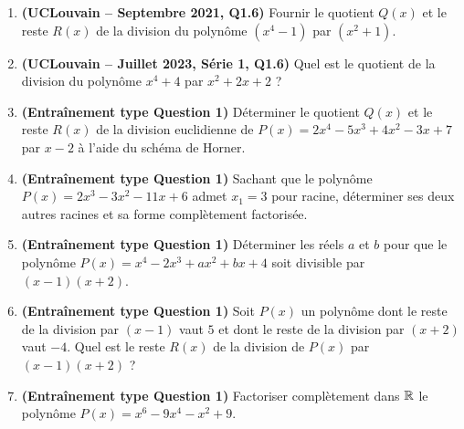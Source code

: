 \begin{enumerate}[label=\textbf{Exercice 1.\arabic* :}, leftmargin=*]
    \item \textbf{(UCLouvain -- Septembre 2021, Q1.6)} Fournir le quotient $Q(x)$ et le reste $R(x)$ de la division du polynôme $(x^4 - 1)$ par $(x^2 + 1)$.
    \item \textbf{(UCLouvain -- Juillet 2023, Série 1, Q1.6)} Quel est le quotient de la division du polynôme $x^4 + 4$ par $x^2 + 2x + 2$ ?
    \item \textbf{(Entraînement type Question 1)} Déterminer le quotient $Q(x)$ et le reste $R(x)$ de la division euclidienne de $P(x) = 2x^4 - 5x^3 + 4x^2 - 3x + 7$ par $x - 2$ à l'aide du schéma de Horner.
    \item \textbf{(Entraînement type Question 1)} Sachant que le polynôme $P(x) = 2x^3 - 3x^2 - 11x + 6$ admet $x_1 = 3$ pour racine, déterminer ses deux autres racines et sa forme complètement factorisée.
    \item \textbf{(Entraînement type Question 1)} Déterminer les réels $a$ et $b$ pour que le polynôme $P(x) = x^4 - 2x^3 + ax^2 + bx + 4$ soit divisible par $(x - 1)(x + 2)$.
    \item \textbf{(Entraînement type Question 1)} Soit $P(x)$ un polynôme dont le reste de la division par $(x - 1)$ vaut $5$ et dont le reste de la division par $(x + 2)$ vaut $-4$. Quel est le reste $R(x)$ de la division de $P(x)$ par $(x - 1)(x + 2)$ ?
    \item \textbf{(Entraînement type Question 1)} Factoriser complètement dans $\mathbb{R}$ le polynôme $P(x) = x^6 - 9x^4 - x^2 + 9$.
\end{enumerate}
